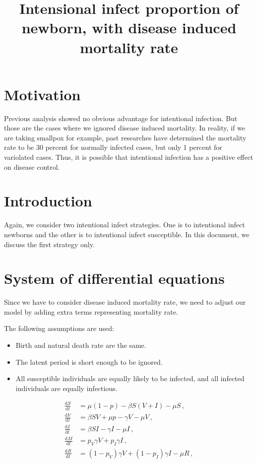 \documentclass[12pt]{article}
\title{Intensional infect proportion of newborn, with disease induced mortality rate}
\newcommand\dbyd[2]{\frac{\mathrm d{#1}}{\mathrm d{#2}}}
\newcommand{\pmV}{p_{V}}
\newcommand{\pmI}{p_{I}}
\begin{document}
\linenumbers
\maketitle

\section{Motivation}

Previous analysis showed no obvious advantage for intentional infection. But those are the cases where we ignored disease induced mortality. In reality, if we are taking smallpox for example, past researches have determined the mortality rate to be 30 percent for normally infected cases, but only 1 percent for variolated cases. Thus, it is possible that intentional infection has a positive effect on disease control.

\section{Introduction}

Again, we consider two intentional infect strategies. One is to intentional infect newborns and the other is to intentional infect susceptible. In this document, we discuss the first strategy only.

\section{System of differential equations}
Since we have to consider disease induced mortality rate, we need to adjust our model by adding extra terms representing mortality rate.

The following assumptions are used:

\begin{itemize}
\item Birth and natural death rate are the same.
\item The latent period is short enough to be ignored.
\item All susceptible individuals are equally likely to be infected, and all infected individuals are equally infectious.
\end{itemize}

\begin{equation}\label{1}
\begin{split}
\dbyd{S}{t}&=\mu(1-p)- \beta S(V+I)-\mu S \,,\\
\dbyd{V}{t}&=\beta SV+\mu p-\gamma V -\mu V\,,\\
\dbyd{I}{t}&=\beta SI-\gamma I -\mu I\,,\\
\dbyd{M}{t}&=\pmV\gamma V+\pmI\gamma I\,,\\
\dbyd{R}{t}&=(1-\pmV)\gamma V+(1-\pmI)\gamma I-\mu R\,,
\end{split}
\end{equation}
\end{document}
